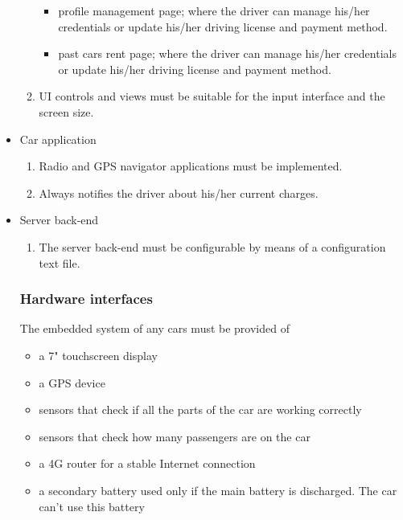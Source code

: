 \begin{itemize}
\begin{enumerate}
\begin{itemize}
					\item profile management page; where the driver can manage his/her credentials or update his/her driving license and payment method.
					\item past cars rent page; where the driver can manage his/her credentials or update his/her driving license and payment method.
				\end{itemize}
			\item UI controls and views must be suitable for the input interface and the screen size.
		\end{enumerate}
	\item Car application
	\begin{enumerate}
		\item Radio and GPS navigator applications must be implemented.
		\item Always notifies the driver about his/her current charges.
	\end{enumerate}
	\item Server back-end
	\begin{enumerate}
		\item The server back-end must be configurable by means of a configuration text file.
	\end{enumerate}
	
\subsubsection{Hardware interfaces}
The embedded system of any cars must be provided of	
\begin{itemize}
	\item a 7" touchscreen display
	\item a GPS device
	\item sensors that check if all the parts of the car are working correctly
	\item sensors that check how many passengers are on the car
	\item a 4G router for a stable Internet connection
	\item a secondary battery used only if the main battery is discharged. The car can't use this battery
\end{itemize}


\end{itemize}
